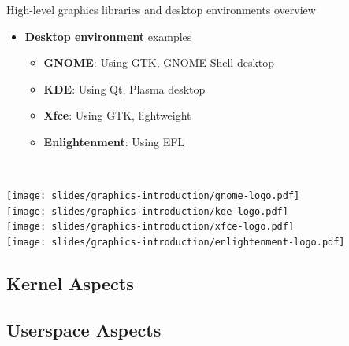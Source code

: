 \begin{frame}{High-level graphics libraries and desktop environments overview}
\begin{minipage}[b]{0.8\textwidth}
\begin{itemize}
  \textit{gives a consistent look and feel across the system}
  \item \textbf{Desktop environment} examples
    \begin{itemize}
    \item \textbf{GNOME}: Using GTK, GNOME-Shell desktop
    \item \textbf{KDE}: Using Qt, Plasma desktop
    \item \textbf{Xfce}: Using GTK, lightweight
    \item \textbf{Enlightenment}: Using EFL
    \end{itemize}
  \end{itemize}
  \vfill~
  \end{minipage}
  \begin{minipage}[b]{0.09\textwidth}
  \centering
  \texttt{[image: slides/graphics-introduction/gnome-logo.pdf]}\\
  \vspace{1em}
  \texttt{[image: slides/graphics-introduction/kde-logo.pdf]}\\
  \vspace{1em}
  \texttt{[image: slides/graphics-introduction/xfce-logo.pdf]}\\
  \vspace{0.5em}
  \texttt{[image: slides/graphics-introduction/enlightenment-logo.pdf]}
  \end{minipage}
\end{frame}

\subsection{Kernel Aspects}
\subsection{Userspace Aspects}
